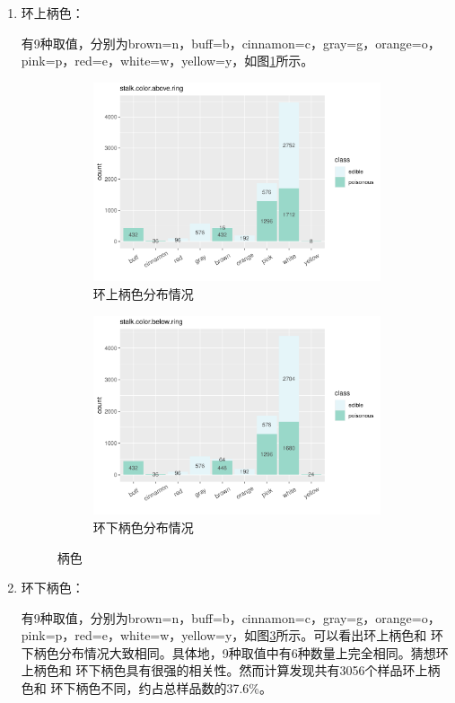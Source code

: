 \documentclass[lang=cn,11pt,a4paper,cite=super]{elegantpaper}
\begin{document}
\begin{enumerate}
   \item 环上柄色：\par 有9种取值，分别为brown=n，buff=b，cinnamon=c，gray=g，orange=o，
   pink=p，red=e，white=w，yellow=y，如图\ref{fig:sca}所示。
   \begin{figure}[!htbp]
      \begin{subfigure}[b]{0.49\textwidth}
        \centering
        \includegraphics[width=\linewidth]{img/stalkcolorabovering-1.pdf}  
      \caption{环上柄色分布情况}
      \label{fig:sca}
      \end{subfigure}
      \begin{subfigure}[b]{0.49\textwidth}
        \centering
        \includegraphics[width=\linewidth]{img/stalkcolorbelowring-1.pdf}  
        \caption{环下柄色分布情况}
        \label{fig:scb}
      \end{subfigure}
      \caption{柄色}
   \end{figure}
   \item 环下柄色：\par 有9种取值，分别为brown=n，buff=b，cinnamon=c，gray=g，orange=o，
   pink=p，red=e，white=w，yellow=y，如图\ref{fig:scb}所示。可以看出环上柄色和
   环下柄色分布情况大致相同。具体地，9种取值中有6种数量上完全相同。猜想环上柄色和
   环下柄色具有很强的相关性。然而计算发现共有3056个样品环上柄色和
   环下柄色不同，约占总样品数的37.6\%。
   

\end{enumerate}
\end{document}
